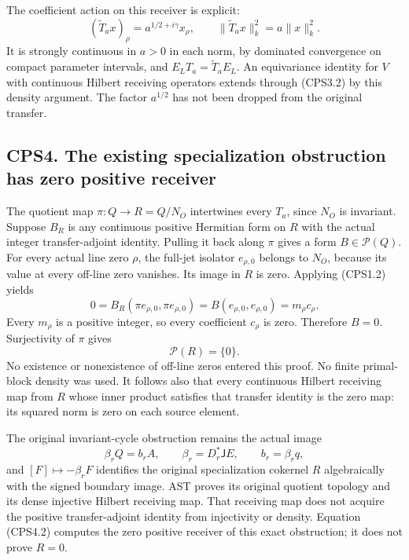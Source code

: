 The coefficient action on this receiver is explicit: \[
(\widetilde T_a x)_\rho=a^{1/2+i\gamma}x_\rho,
\qquad
\|\widetilde T_a x\|_k^2=a\|x\|_k^2.
\tag{CPS3.3}
\] It is strongly continuous in \(a>0\) in each norm, by dominated
convergence on compact parameter intervals, and
\(E_LT_a=\widetilde T_aE_L\). An equivariance identity for \(V\) with
continuous Hilbert receiving operators extends through (CPS3.2) by this
density argument. The factor \(a^{1/2}\) has not been dropped from the
original transfer.

\subsection{CPS4. The existing specialization obstruction has zero
positive
receiver}\label{cps4.-the-existing-specialization-obstruction-has-zero-positive-receiver}

The quotient map \(\pi:Q\to R=Q/N_O\) intertwines every \(T_a\), since
\(N_O\) is invariant. Suppose \(B_R\) is any continuous positive
Hermitian form on \(R\) with the actual integer transfer-adjoint
identity. Pulling it back along \(\pi\) gives a form
\(B\in\mathscr P(Q)\). For every actual line zero \(\rho\), the full-jet
isolator \(e_{\rho,0}\) belongs to \(N_O\), because its value at every
off-line zero vanishes. Its image in \(R\) is zero. Applying (CPS1.2)
yields \[
0=B_R(\pi e_{\rho,0},\pi e_{\rho,0})
=B(e_{\rho,0},e_{\rho,0})=m_\rho c_\rho.
\tag{CPS4.1}
\] Every \(m_\rho\) is a positive integer, so every coefficient
\(c_\rho\) is zero. Therefore \(B=0\). Surjectivity of \(\pi\) gives \[
\boxed{\mathscr P(R)=\{0\}.}
\tag{CPS4.2}
\] No existence or nonexistence of off-line zeros entered this proof. No
finite primal-block density was used. It follows also that every
continuous Hilbert receiving map from \(R\) whose inner product
satisfies that transfer identity is the zero map: its squared norm is
zero on each source element.

The original invariant-cycle obstruction remains the actual image \[
\beta_rQ=b_rA,\qquad
\beta_r=D_r^*\mathsf JE,\qquad b_r=\beta_rq,
\tag{CPS4.3}
\] and \([F]\mapsto-\beta_rF\) identifies the original specialization
cokernel \(R\) algebraically with the signed boundary image. AST proves
its original quotient topology and its dense injective Hilbert receiving
map. That receiving map does not acquire the positive transfer-adjoint
identity from injectivity or density. Equation (CPS4.2) computes the
zero positive receiver of this exact obstruction; it does not prove
\(R=0\).


